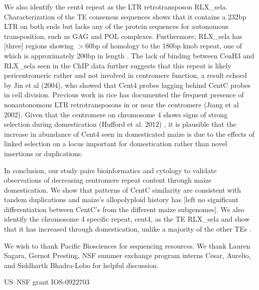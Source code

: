  We also identify the cent4 repeat as the LTR retrotransposon RLX\_sela.  Characterization of the TE consensus sequences shows that it contains a 232bp LTR on both ends but lacks any of the protein sequences for autonomous transposition, such as GAG and POL complexes.  Furthermore, RLX\_sela has [three]  regions showing $>60$bp of homology to the 180bp knob repeat, one of which is approximately 200bp in length .  The lack of binding between CenH3 and RLX\_sela seen in the ChIP data further suggests that this repeat is likely pericentromeric rather and not involved in centromere function, a result echoed by  Jin et al (2004), who showed that Cent4 probes lagging behind CentC probes in cell division.  Previous work in rice  has documented the frequent presence of nonautonomous LTR retrotransposons  in or near  the centromere (Jiang et al 2002).  Given that the centromere on chromosome 4 shows signs of strong selection during domestication (Hufford et al. 2012) , it is plausible that the increase in abundance of Cent4 seen in domesticated maize is due to the effects of linked selection on a locus important for domestication rather than novel insertions or duplications. 

In conclusion, our study pairs bioinformatics and cytology to validate observations of decreasing centromere repeat content through maize domestication.  We show that patterns of CentC similarity are consistent with tandem duplications and maize’s allopolyploid history has [left no significant differentiation between CentC’s from the different maize subgenomes]. We also identify the chromosome 4 specific repeat, cent4, as the TE RLX\_sela and show that it has increased through domestication, unlike a majority of the other TEs \citep{Chia2012}.    


\begin{acknowledgements}
We wish to thank Pacific Biosciences for sequencing resources.  We thank Lauren Sagara, Gernot Presting,  NSF summer exchange program interns Cesar, Aurelio, and Siddharth Bhadra-Lobo for helpful discussion.


US–NSF grant IOS-0922703

\end{acknowledgements}

